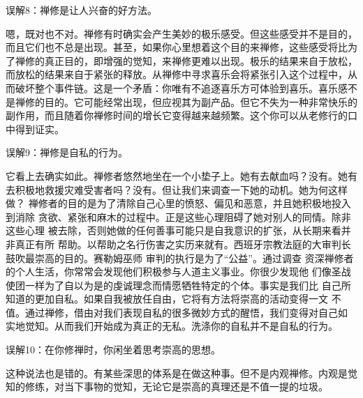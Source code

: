 \subsectnon 误解8：禅修是让人兴奋的好方法。

嗯，既对也不对。禅修有时确实会产生美妙的极乐感受。但这些感受并不是目的，
而且它们也不总是出现。甚至，如果你心里想着这个目的来禅修，这些感受将比为
了禅修的真正目的，即增强的觉知，来禅修更难以出现。极乐的结果来自于放松，
而放松的结果来自于紧张的释放。从禅修中寻求喜乐会将紧张引入这个过程中，从
而破坏整个事件链。这是一个矛盾：你唯有不追逐喜乐方可体验到喜乐。喜乐感不
是禅修的目的。它可能经常出现，但应视其为副产品。但它不失为一种非常快乐的
副作用，而且随着你禅修时间的增长它变得越来越频繁。这个你可以从老修行的口
中得到证实。

\subsectnon 误解9：禅修是自私的行为。

它看上去确实如此。禅修者悠然地坐在一个小垫子上。她有去献血吗？没有。她有
去积极地救援灾难受害者吗？没有。但让我们来调查一下她的动机。她为何这样做？
禅修者的目的是为了清除自己心里的愤怒、偏见和恶意，并且她积极地投入到消除
贪欲、紧张和麻木的过程中。\1正是这些心理阻碍了她对别人的同情。除非这些心理
被去除，否则她做的任何善事可能只是自我意识的扩张，从长期来看并非真正有所
帮助。以帮助之名行伤害之实历来就有。西班牙宗教法庭的大审判长鼓吹最崇高的目的。赛勒姆巫师
审判的执行是为了“公益”。通过调查
资深禅修者的个人生活，你常常会发现他们积极参与人道主义事业。你很少发现他
们像圣战使团一样为了自以为是的虔诚理念而情愿牺牲特定的个体。事实是我们比
自己所知道的更加自私。如果自我被放任自由，它将有方法将崇高的活动变得一文
不值。通过禅修，借由对我们表现自私的很多微妙方式的醒悟，我们变得对自己如
实地觉知。从而我们开始成为真正的无私。洗涤你的自私并不是自私的行为。

\subsectnon 误解10：在你修禅时，你闲坐着思考崇高的思想。

这种说法也是错的。有某些深思的体系是在做这种事。但不是内观禅修。内观是觉
知的修练，对当下事物的觉知，无论它是崇高的真理还是不值一提的垃圾。

\endchapter

\byebye
